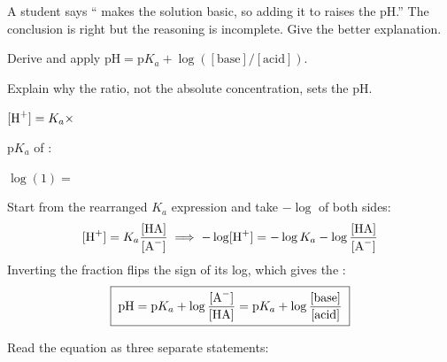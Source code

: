 \documentclass{apchem-notes}
\begin{document}
\begin{exitticket}
A student says `` makes the solution basic, so adding it to 
raises the pH.'' The conclusion is right but the reasoning is incomplete.
Give the better explanation.
\end{exitticket}


\begin{objectives}
  \item Derive and apply $\mathrm{pH} = \mathrm{p}K_a +
        \log([\text{base}]/[\text{acid}])$.
  \item Explain why the ratio, not the absolute concentration, sets the pH.
\end{objectives}


\begin{warmup}[3]
  \item $[\ce{H+}] = K_a \times$ \answerblank[3cm]{$[\ce{HA}]/[\ce{A^-}]$}
  \item p$K_a$ of : 
  \item $\log(1) =$ 
\end{warmup}



Start from the rearranged $K_a$ expression and take $-\log$ of both sides:
\[ [\ce{H+}] = K_a\frac{[\ce{HA}]}{[\ce{A^-}]}
   \;\Longrightarrow\;
   -\log[\ce{H+}] = -\log K_a - \log\frac{[\ce{HA}]}{[\ce{A^-}]} \]
Inverting the fraction flips the sign of its log, which gives the
:
\[ \boxed{\;\mathrm{pH} = \mathrm{p}K_a
   + \log\frac{[\ce{A^-}]}{[\ce{HA}]}
   = \mathrm{p}K_a + \log\frac{[\text{base}]}{[\text{acid}]}\;} \]

Read the equation as three separate statements:
\end{document}
